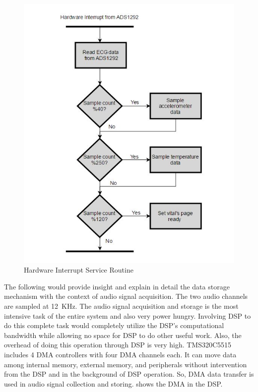  
 \begin{figure}
 	\centering
 	\includegraphics[scale = 1 ]{ECG_interrupt}
 	\caption{Hardware Interrupt Service Routine\label{ecg_isr}}
 \end{figure}

The following would provide insight and explain in detail the data
storage mechanism with the context of audio signal acquisition.  The
two audio channels are sampled at 12~KHz. The audio signal
acquisition and storage is the most intensive task of the entire
system and also very power hungry.  Involving DSP to do this complete
task would completely utilize the DSP's computational bandwidth while
allowing no space for DSP to do other useful work.  Also, the
overhead of doing this operation through DSP is very high.
TMS320C5515 includes 4 DMA controllers with four DMA channels each.
It can move data among internal memory, external memory, and
peripherals without intervention from the DSP and in the background
of DSP operation. So, DMA data transfer is used in audio signal
collection and storing.  shows the DMA in the
DSP. 

